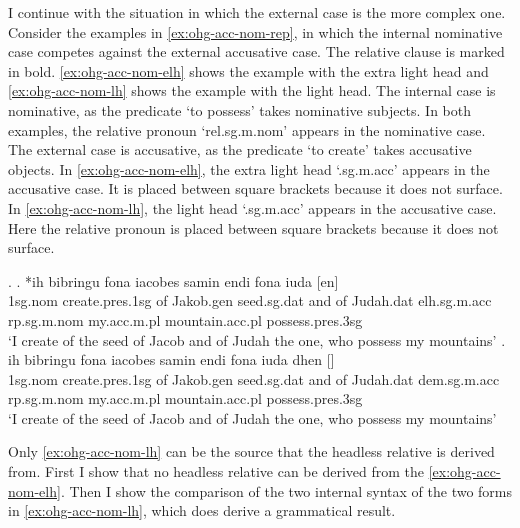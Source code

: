 I continue with the situation in which the external case is the more complex one.
Consider the examples in \ref{ex:ohg-acc-nom-rep}, in which the internal nominative case competes against the external accusative case. The relative clause is marked in bold. \ref{ex:ohg-acc-nom-elh} shows the example with the extra light head and \ref{ex:ohg-acc-nom-lh} shows the example with the light head.
The internal case is nominative, as the predicate  `to possess' takes nominative subjects.
In both examples, the relative pronoun  `\ac{rel}.\ac{sg}.\ac{m}.\ac{nom}' appears in the nominative case.
The external case is accusative, as the predicate  `to create' takes accusative objects.
In \ref{ex:ohg-acc-nom-elh}, the extra light head  `.\ac{sg}.\ac{m}.\ac{acc}' appears in the accusative case. It is placed between square brackets because it does not surface.
In \ref{ex:ohg-acc-nom-lh}, the light head  `.\ac{sg}.\ac{m}.\ac{acc}' appears in the accusative case. Here the relative pronoun is placed between square brackets because it does not surface.

\ex.\label{ex:ohg-acc-nom-rep}
\ag. *ih bibringu fona iacobes samin endi fona iuda [en]    \\
1\ac{sg}.\ac{nom} {create}.\ac{pres}.1\ac{sg}\scsub{[acc]} of Jakob.\ac{gen} seed.\ac{sg}.\ac{dat} and of Judah.\ac{dat} \ac{elh}.\ac{sg}.\ac{m}.\ac{acc} \ac{rp}.\ac{sg}.\ac{m}.\ac{nom} my.\ac{acc}.\ac{m}.\ac{pl} mountain.\ac{acc}.\ac{pl} possess.\ac{pres}.3\ac{sg}\scsub{[nom]}\\
`I create of the seed of Jacob and of Judah the one, who possess my mountains' \label{ex:ohg-acc-nom-elh}
\bg. ih bibringu fona iacobes samin endi fona iuda dhen []   \\
1\ac{sg}.\ac{nom} {create}.\ac{pres}.1\ac{sg}\scsub{[acc]} of Jakob.\ac{gen} seed.\ac{sg}.\ac{dat} and of Judah.\ac{dat} \ac{dem}.\ac{sg}.\ac{m}.\ac{acc} \ac{rp}.\ac{sg}.\ac{m}.\ac{nom} my.\ac{acc}.\ac{m}.\ac{pl} mountain.\ac{acc}.\ac{pl} possess.\ac{pres}.3\ac{sg}\scsub{[nom]}\\
`I create of the seed of Jacob and of Judah the one, who possess my mountains' \label{ex:ohg-acc-nom-lh}

Only \ref{ex:ohg-acc-nom-lh} can be the source that the headless relative is derived from. First I show that no headless relative can be derived from the \ref{ex:ohg-acc-nom-elh}. Then I show the comparison of the two internal syntax of the two forms in \ref{ex:ohg-acc-nom-lh}, which does derive a grammatical result.


